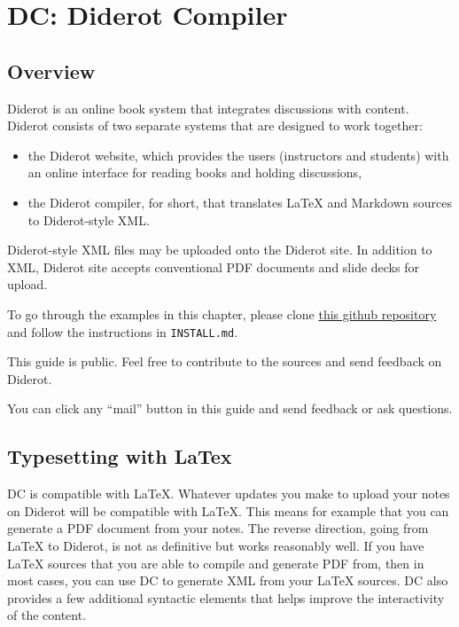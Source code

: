 \chapter{DC: Diderot Compiler}
\label{mtl}
 

\section{Overview}

Diderot is an online book system that integrates discussions with
content.  Diderot consists of two separate systems that are
designed to work together:
%
\begin{itemize}
\item the Diderot website, which
provides the users (instructors and students) with an online interface
for reading books and holding discussions, 
\item the Diderot
compiler,  for short, that translates LaTeX and Markdown
sources to Diderot-style XML.
\end{itemize}
%
Diderot-style XML files may be uploaded onto the Diderot site. 
%
In addition to XML, Diderot site accepts conventional PDF documents
and slide decks for upload. 
%


\begin{important}
To go through the examples in this chapter, please clone 
%
\href{https://github.com/diderot-edu/guide}{this github repository}
%
and follow the instructions in \lstinline`INSTALL.md`. 

This guide is public.  Feel free to contribute to the sources and send feedback on Diderot.  
\end{important}

\begin{note}
You can click any ``mail''  button in this guide and send feedback or ask questions. 
\end{note}

\section{Typesetting with LaTex}

DC is compatible with LaTeX. Whatever updates you make to upload your notes on Diderot will be compatible with LaTeX. 
%
This means for example that you can generate a PDF document from your notes.
%
The reverse direction, going from LaTeX to Diderot, is not as definitive but works reasonably well.
%
If you have  LaTeX sources that you are able to compile and generate PDF from, then in most cases, you can use DC to generate XML from your LaTeX sources.  
%
DC also provides a few additional syntactic elements that helps improve the interactivity of the content.  
%

